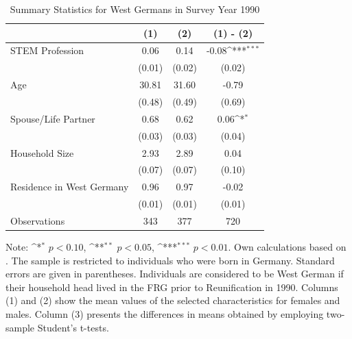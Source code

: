 \documentclass[a4paper, oneside, hyperfootnotes = false]{article}
\def\sym#1{\ifmmode^{#1}\else\(^{#1}\)\fi}
\begin{document}
{\begin{table}[ht]
\begin{center}
	\end{center}
\end{table}

\begin{table}[ht]
	\caption{Summary Statistics for West Germans in Survey Year 1990}
	\label{tab:descr_summary_west}
	\begin{center}
		\begin{tabular}{l*{3}{c}}
			\toprule
			& (1) & (2) & (1) - (2) \\
			\midrule
			STEM Profession & 0.06  & 0.14 &  -0.08\sym{***}      \\
			&   (0.01)  & (0.02) & (0.02) \\
			\addlinespace
			Age         & 30.81     &  31.60   &    -0.79     \\
			&     (0.48) &        (0.49)         &      (0.69) \\
			\addlinespace
			Spouse/Life Partner & 0.68       &  0.62   &     0.06\sym{*}      \\
			&      (0.03)&          (0.03)&         (0.04) \\
			\addlinespace
			Household Size      &  2.93   &  2.89   &    0.04       \\
			&          (0.07)&       (0.07)        &      (0.10)\\
			\addlinespace
			Residence in West Germany& 0.96    &  0.97   &    -0.02        \\
			&         (0.01) &       (0.01)&  (0.01)\\
			\midrule
			Observations        &        343 &     377     &       720                \\
			\bottomrule
		\end{tabular}
		
		\vspace{2mm}
		
		\parbox{10cm}{
			\linespread{1}\footnotesize Note: \sym{*} \(p<0.10\), \sym{**} \(p<0.05\), \sym{***} \(p<0.01\). Own calculations based on \cite{SOEP2023}. The sample is restricted to individuals who were born in Germany. Standard errors are given in parentheses. Individuals are considered to be West German if their household head lived in the FRG prior to Reunification in 1990. Columns (1) and (2) show the mean values of the selected characteristics for females and males. Column (3) presents the differences in means obtained by employing two-sample Student's t-tests.}
		
	\end{center}
\end{table}

}
\end{document}
